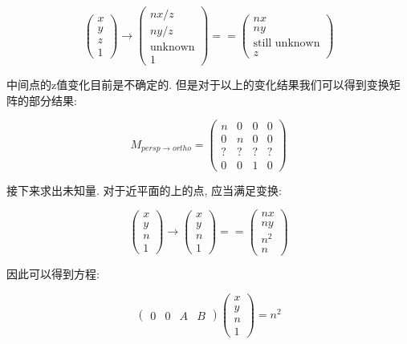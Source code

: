 \documentclass[openany]{progbookcn}
\begin{document}
\begin{equation}
	\begin{pmatrix}x\\y\\z\\1\end{pmatrix}\rightarrow\begin{pmatrix}nx/z\\ny/z\\\text{unknown}\\1\end{pmatrix}==\begin{pmatrix}nx\\ny\\\text{still unknown}\\z\end{pmatrix}
\end{equation}

中间点的z值变化目前是不确定的. 但是对于以上的变化结果我们可以得到变换矩阵的部分结果: 

\begin{equation}
	M_{persp\rightarrow ortho}=\begin{pmatrix}n&0&0&0\\0&n&0&0\\?&?&?&?\\0&0&1&0\end{pmatrix}
\end{equation}

接下来求出未知量. 对于近平面的上的点, 应当满足变换: 

\begin{equation}
	\begin{pmatrix}x\\y\\n\\1\end{pmatrix}\rightarrow\begin{pmatrix}x\\y\\n\\1\end{pmatrix}==\begin{pmatrix}nx\\ny\\n^2\\n\end{pmatrix}
\end{equation}

因此可以得到方程: 

\begin{equation}
	\begin{pmatrix}0&0&A&B\end{pmatrix}\begin{pmatrix}x\\y\\n\\1\end{pmatrix}=n^2
\end{equation}
\end{document}
